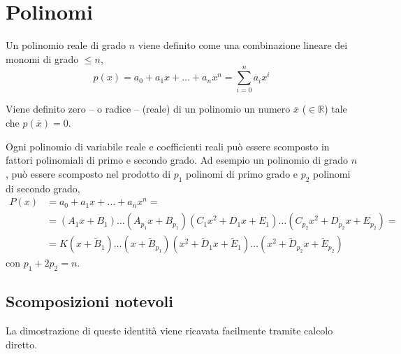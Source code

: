 \begin{definition}
\end{definition}

\section{Polinomi}
\begin{definition}[Polinomio]
Un polinomio reale di grado $n$ viene definito come una combinazione lineare dei monomi di grado $\le n$,
\begin{equation}
 p(x) = a_0 + a_1 x + \dots + a_n x^n = \sum_{i=0}^{n} a_i x^i
\end{equation}
\end{definition}

\begin{definition} Viene definito zero -- o radice -- (reale) di un polinomio un numero $\overline{x}$ ($\in \mathbb{R}$) tale che $p(\overline{x}) = 0$.
\end{definition}

\begin{definition}
    Ogni polinomio di variabile reale e coefficienti reali può essere scomposto in fattori polinomiali di primo e secondo grado. Ad esempio un polinomio di grado $n$, può essere scomposto nel prodotto di $p_1$ polinomi di primo grado e $p_2$ polinomi di secondo grado,
    \begin{equation}
        \begin{aligned}
            P(x) & = a_0 + a_1 x + \dots + a_n x^n = \\
            & = (A_1 x+B_1) \dots (A_{p_1}x+B_{p_1}) (C_1 x^2+D_1 x+E_1) \dots (C_{p_2} x^2 + D_{p_2} x + E_{p_2} ) = \\
            & = K (x+\tilde{B}_1) \dots (x+\tilde{B}_{p_1}) (x^2 + \tilde{D}_1 x + \tilde{E}_1) \dots (x^2 + \tilde{D}_{p_2} x + \tilde{E}_{p_2})
        \end{aligned}
    \end{equation}
    con $p_1 + 2 p_2 = n$.
\end{definition}

\subsection{Scomposizioni notevoli}
La dimostrazione di queste identità viene ricavata facilmente tramite calcolo diretto.
